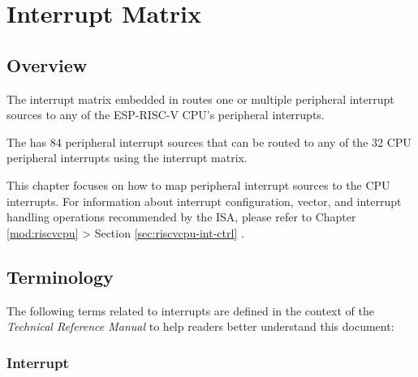 \documentclass[main\_\_EN.tex]{subfiles}
\begin{document}

\ifglobal
\else
    \listoftodos
    {\let\clearpage\relax \listofdonetodos}
    \tableofcontents
\fi










\hypertarget{intmtrx}{}
\chapter{Interrupt Matrix}
\label{mod:intmtrx}
\section{Overview}
The interrupt matrix embedded in \chipname{} routes one or multiple peripheral interrupt sources to any of the ESP-RISC-V CPU's peripheral interrupts.

The \chipname{} has 84 peripheral interrupt sources that can be routed to any of the 32 CPU peripheral interrupts using the interrupt matrix.

\begin{tiplisting}
This chapter focuses on how to map peripheral interrupt sources to the CPU interrupts. For information about interrupt configuration, vector, and interrupt handling operations recommended by the ISA, please refer to Chapter \ref{mod:riscvcpu} \textit{}  > Section \ref{sec:riscvcpu-int-ctrl} \textit{}.
\end{tiplisting}
\vspace{-1em}

\section{Terminology}\label{sec:intmtx-int-terminology}

The following terms related to interrupts are defined in the context of the \textit{\chipname{} Technical Reference Manual} to help readers better understand this document:

\subsection{Interrupt}
\end{document}
